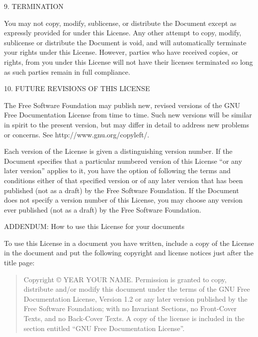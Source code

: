 \documentclass[10pt,a4paper,final]{book}
\begin{document}
{\begin{center}
{\Large 9. TERMINATION\par}
\end{center}


You may not copy, modify, sublicense, or distribute the Document except
as expressly provided for under this License.  Any other attempt to
copy, modify, sublicense or distribute the Document is void, and will
automatically terminate your rights under this License.  However,
parties who have received copies, or rights, from you under this
License will not have their licenses terminated so long as such
parties remain in full compliance.


\begin{center}
{\Large 10. FUTURE REVISIONS OF THIS LICENSE\par}
\end{center}


The Free Software Foundation may publish new, revised versions
of the GNU Free Documentation License from time to time.  Such new
versions will be similar in spirit to the present version, but may
differ in detail to address new problems or concerns.  See
http://www.gnu.org/copyleft/.

Each version of the License is given a distinguishing version number.
If the Document specifies that a particular numbered version of this
License ``or any later version'' applies to it, you have the option of
following the terms and conditions either of that specified version or
of any later version that has been published (not as a draft) by the
Free Software Foundation.  If the Document does not specify a version
number of this License, you may choose any version ever published (not
as a draft) by the Free Software Foundation.


\begin{center}
{\Large ADDENDUM: How to use this License for your documents\par}
\end{center}

To use this License in a document you have written, include a copy of
the License in the document and put the following copyright and
license notices just after the title page:

\begin{quote}
    Copyright \copyright{}  YEAR  YOUR NAME.
    Permission is granted to copy, distribute and/or modify this document
    under the terms of the GNU Free Documentation License, Version 1.2
    or any later version published by the Free Software Foundation;
    with no Invariant Sections, no Front-Cover Texts, and no Back-Cover Texts.
    A copy of the license is included in the section entitled ``GNU
    Free Documentation License''.
\end{quote}
    
}
\end{document}
